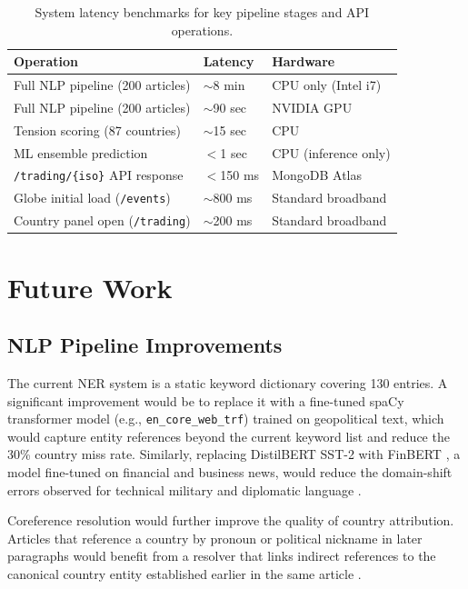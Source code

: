 \documentclass[12pt,a4paper]{report}
\begin{document}
\begin{table}[H]
\centering
\caption{System latency benchmarks for key pipeline stages and API
  operations.}
\label{tab:latency}
\begin{tabular}{lll}
\toprule
\textbf{Operation} & \textbf{Latency} & \textbf{Hardware} \\
\midrule
Full NLP pipeline (200 articles) & $\sim$8 min & CPU only (Intel i7) \\
Full NLP pipeline (200 articles) & $\sim$90 sec & NVIDIA GPU \\
Tension scoring (87 countries) & $\sim$15 sec & CPU \\
ML ensemble prediction & $<$1 sec & CPU (inference only) \\
\texttt{/trading/\{iso\}} API response & $<$150 ms & MongoDB Atlas \\
Globe initial load (\texttt{/events}) & $\sim$800 ms & Standard broadband \\
Country panel open (\texttt{/trading}) & $\sim$200 ms & Standard broadband \\
\bottomrule
\end{tabular}
\end{table}

\chapter{Future Work}
\label{ch:futurework}

\section{NLP Pipeline Improvements}
\label{sec:futurenl}

The current NER system is a static keyword dictionary covering 130
entries. A significant improvement would be to replace it with a
fine-tuned spaCy transformer model (e.g., \texttt{en\_core\_web\_trf})
trained on geopolitical text, which would capture entity references
beyond the current keyword list and reduce the 30\% country miss rate.
Similarly, replacing DistilBERT SST-2 with FinBERT \cite{araci2019}, a
model fine-tuned on financial and business news, would reduce the
domain-shift errors observed for technical military and diplomatic language
\cite{loughran2011}.

Coreference resolution would further improve the quality of country
attribution. Articles that reference a country by pronoun or political
nickname in later paragraphs would benefit from a resolver that links
indirect references to the canonical country entity established earlier
in the same article \cite{nassirtoussi2014}.
\end{document}
